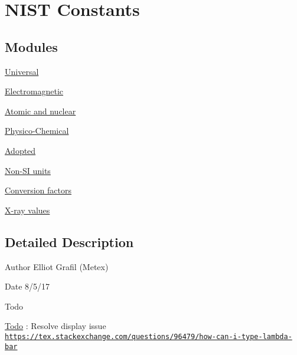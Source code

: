 \hypertarget{group___n_i_s_t_const}{}\section{N\+I\+ST Constants}
\label{group___n_i_s_t_const}
\subsection*{Modules}
\begin{DoxyCompactItemize}
\item 
\hyperlink{group___universal}{Universal}
\item 
\hyperlink{group___electromagnetic}{Electromagnetic}
\item 
\hyperlink{group___atomic}{Atomic and nuclear}
\item 
\hyperlink{group___physico_chemical}{Physico-\/\+Chemical}
\item 
\hyperlink{group___adopted}{Adopted}
\item 
\hyperlink{group___non-_s_i}{Non-\/\+S\+I units}
\item 
\hyperlink{group___conversion_factors}{Conversion factors}
\item 
\hyperlink{group___x-ray}{X-\/ray values}
\end{DoxyCompactItemize}


\subsection{Detailed Description}
\begin{DoxyAuthor}{Author}
Elliot Grafil (Metex) 
\end{DoxyAuthor}
\begin{DoxyDate}{Date}
8/5/17 
\end{DoxyDate}
\begin{DoxyRefDesc}{Todo}
\item[\hyperlink{todo__todo000001}{Todo}]\+: Resolve  display issue \href{https://tex.stackexchange.com/questions/96479/how-can-i-type-lambda-bar}{\tt https\+://tex.\+stackexchange.\+com/questions/96479/how-\/can-\/i-\/type-\/lambda-\/bar} \end{DoxyRefDesc}
